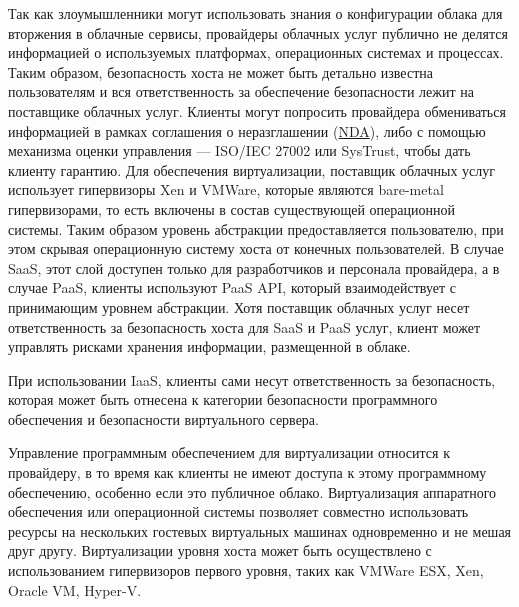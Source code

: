 Так как злоумышленники могут использовать знания о конфигурации облака для вторжения в облачные сервисы, провайдеры облачных услуг публично не делятся информацией о используемых платформах, операционных системах и процессах.
Таким образом, безопасность хоста не может быть детально известна пользователям и вся ответственность за обеспечение безопасности лежит на поставщике облачных услуг.
Клиенты могут попросить провайдера обмениваться информацией в рамках соглашения о неразглашении (\hyperlink{nda}{NDA}), либо с помощью механизма оценки управления --- ISO/IEC 27002 или SysTrust, чтобы дать клиенту гарантию.
Для обеспечения виртуализации, поставщик облачных услуг использует гипервизоры Xen и VMWare, которые являются bare-metal гипервизорами, то есть включены в состав существующей операционной системы.
Таким образом уровень абстракции предоставляется пользователю, при этом скрывая операционную систему хоста от конечных пользователей.
В случае SaaS, этот слой доступен только для разработчиков и персонала провайдера, а в случае PaaS, клиенты используют PaaS API, который взаимодействует с принимающим уровнем абстракции.
Хотя поставщик облачных услуг несет ответственность за безопасность хоста для SaaS и PaaS услуг, клиент может управлять рисками хранения информации, размещенной в облаке.

При использовании IaaS, клиенты сами несут ответственность за безопасность, которая может быть отнесена к категории безопасности программного обеспечения и безопасности виртуального сервера.

Управление программным обеспечением для виртуализации относится к провайдеру, в то время как клиенты не имеют доступа к этому программному обеспечению, особенно если это публичное облако.
Виртуализация аппаратного обеспечения или операционной системы позволяет совместно использовать ресурсы на нескольких гостевых виртуальных машинах одновременно и не мешая друг другу.
Виртуализации уровня хоста может быть осуществлено с использованием гипервизоров первого уровня, таких как VMWare ESX, Xen, Oracle VM, Hyper-V.

